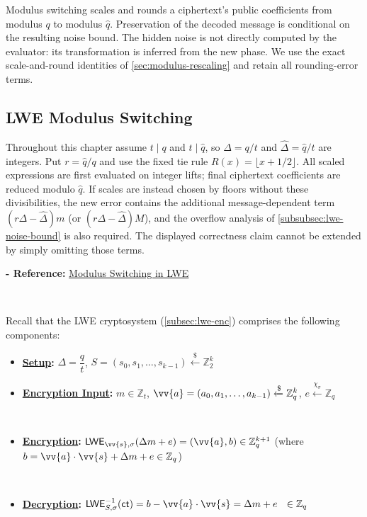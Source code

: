 Modulus switching scales and rounds a ciphertext's public coefficients from modulus $q$ to modulus $\hat q$. Preservation of the decoded message is conditional on the resulting noise bound. The hidden noise is not directly computed by the evaluator: its transformation is inferred from the new phase. We use the exact scale-and-round identities of \autoref{sec:modulus-rescaling} and retain all rounding-error terms.


\subsection{LWE Modulus Switching}
\label{subsec:modulus-switch-lwe}

Throughout this chapter assume $t\mid q$ and $t\mid\hat q$, so $\Delta=q/t$ and $\hat\Delta=\hat q/t$ are integers. Put $r=\hat q/q$ and use the fixed tie rule $R(x)=\lfloor x+1/2\rfloor$. All scaled expressions are first evaluated on integer lifts; final ciphertext coefficients are reduced modulo $\hat q$. If scales are instead chosen by floors without these divisibilities, the new error contains the additional message-dependent term $(r\Delta-\hat\Delta)m$ (or $(r\Delta-\hat\Delta)M$), and the overflow analysis of \autoref{subsubsec:lwe-noise-bound} is also required. The displayed correctness claim cannot be extended by simply omitting those terms.

\textbf{- Reference:} 
\href{https://www.jeremykun.com/2022/07/16/modulus-switching-in-lwe/}{Modulus Switching in LWE}

$ $

Recall that the LWE cryptosystem (\autoref{subsec:lwe-enc}) comprises the following components:

\begin{itemize}
\item \textbf{\underline{Setup}:} $\Delta = \dfrac{q}{t}$, \text{ } $S = (s_0, s_1, \ldots, s_{k-1}) \xleftarrow{\$} \mathbb{Z}_2^{k}$

\item \textbf{\underline{Encryption Input}:} $m \in \mathbb{Z}_t$, \text{ } $\vv{a} = (a_0, a_1, \ldots, a_{k-1}) \xleftarrow{\$} \mathbb{Z}_q^{k}$, \text{ } $e \xleftarrow{\chi_\sigma} \mathbb{Z}_q$

$ $

\item \textbf{\underline{Encryption}:} $\textsf{LWE}_{\vv{s},\sigma}(\Delta  m + e) = (\vv{a}, b) \in \mathbb{Z}_q^{k + 1}$ \text{ } (where $b = \vv{a} \cdot \vv{s} + \Delta  m + e \in \mathbb{Z}_q$)

$ $

\item \textbf{\underline{Decryption}:} $\textsf{LWE}^{-1}_{S,\sigma}(\textsf{ct}) = b - \vv{a}\cdot \vv{s} = \Delta  m + e \text{ } \text{ } \in \mathbb{Z}_q$

\end{itemize}

